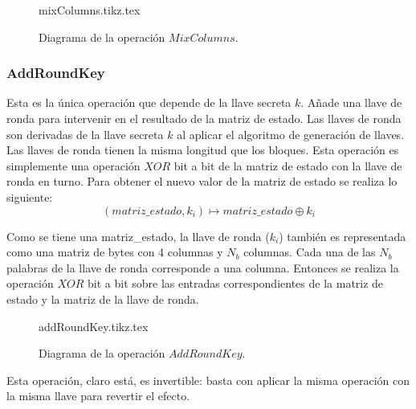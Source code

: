 \begin{figure}
  \begin{center}
    {mixColumns.tikz.tex}
    \caption{Diagrama de la operación $MixColumns$.}
   \end{center}
\end{figure}


\subsubsection{AddRoundKey}

Esta es la única operación que depende de la llave secreta $k$. Añade una
llave de ronda para intervenir en el resultado de la matriz de estado.
Las llaves de ronda son derivadas de la llave secreta $k$ al aplicar el
algoritmo de generación de llaves. Las llaves de ronda tienen la misma
longitud que los bloques. Esta operación es simplemente una operación
$XOR$ bit a bit de la matriz de estado con la llave de ronda en turno.
Para obtener el nuevo valor de la matriz de estado se realiza lo
siguiente:
\begin{equation}
  \label{cifrado_aes_addkey}
  (matriz\_estado, k_i) \mapsto matriz\_estado \oplus k_i
\end{equation}

Como se tiene una matriz\_estado, la llave de ronda ($k_i$) también
es representada como una matriz de bytes con 4 columnas y $N_b$ columnas.
Cada una de las $N_b$ palabras de la llave de ronda corresponde a una
columna. Entonces se realiza la operación $XOR$ bit a bit sobre las
entradas correspondientes de la matriz de estado y la matriz de la llave
de ronda.

\begin{figure}
  \begin{center}
    {addRoundKey.tikz.tex}
    \caption{Diagrama de la operación $AddRoundKey$.}
   \end{center}
\end{figure}

Esta operación, claro está, es invertible: basta con aplicar la misma
operación con la misma llave para revertir el efecto.
